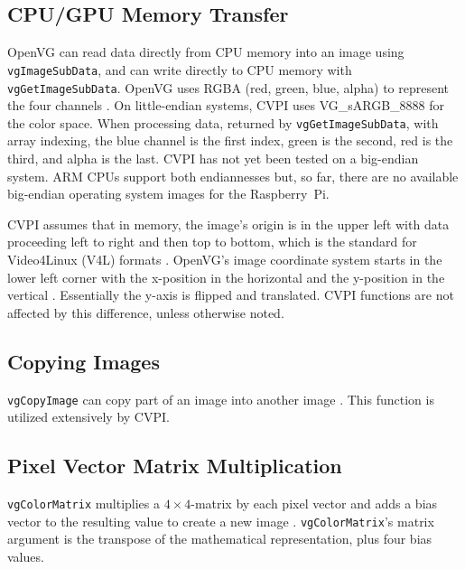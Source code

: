 \documentclass[12pt]{report}
\def\byX {\!\!\times\!\!}
\begin{document}
\subsection{CPU/GPU Memory Transfer}
\label{sec-3-1-1}
OpenVG can read data directly from CPU memory into an image using {\tt
  vgImageSubData}, and can write directly to CPU memory with {\tt
  vgGetImageSubData}. OpenVG uses RGBA (red, green, blue, alpha) to
represent the four channels \cite{openvg}. On little-endian systems,
CVPI uses VG\_sARGB\_8888 for the color space. When processing data,
returned by {\tt vgGetImageSubData}, with array indexing, the blue
channel is the first index, green is the second, red is the third, and
alpha is the last. CVPI has not yet been tested on a big-endian
system. ARM CPUs support both endiannesses but, so far, there are no
available big-endian operating system images for the Raspberry~Pi.

CVPI assumes that in memory, the image's origin is in the upper left
with data proceeding left to right and then top to bottom, which is
the standard for Video4Linux (V4L) formats
\cite[Sec.~2.1]{videoForLinux}. OpenVG's image coordinate system
starts in the lower left corner with the x-position in the horizontal
and the y-position in the vertical \cite[Sec.~10.1]{openvg}.
Essentially the y-axis is flipped and translated.  CVPI functions are
not affected by this difference, unless otherwise noted.

\subsection{Copying Images}
\label{sec-3-1-2} {\tt vgCopyImage} can copy part of an image into
another image \cite{openvg}. This function is utilized extensively by
CVPI.

\subsection{Pixel Vector Matrix Multiplication}
\label{sec-3-1-3} {\tt vgColorMatrix} multiplies a $4\byX 4$-matrix by each
pixel vector and adds a bias vector to the resulting value to
create a new image \cite{openvg}.
{\tt vgColorMatrix}'s matrix argument is the transpose of the
mathematical representation, plus four bias values.
\end{document}
